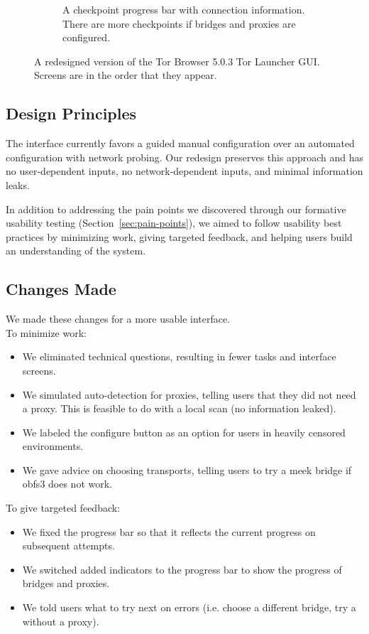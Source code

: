 \documentclass[USenglish,oneside,twocolumn]{article}
\begin{document}
\begin{figure}
\begin{subfigure}[b]{0.30\textwidth}
	\centering\captionsetup{width=1.5\linewidth}%
	\caption{A checkpoint progress bar with connection information. There are more checkpoints if bridges and proxies are configured.}
	\label{fig:new-progress}
\end{subfigure}
\caption{
A redesigned version of the Tor Browser 5.0.3 Tor Launcher GUI. Screens are in the order that they appear. 
}
\label{fig:new-interface}
\end{figure} 

\subsection{Design Principles} 
The interface currently favors a guided manual configuration over an automated configuration with network probing. Our redesign preserves this approach and has no user-dependent inputs, no network-dependent inputs, and minimal information leaks.

In addition to addressing the pain points we discovered through our formative usability testing (Section~\ref{sec:pain-points}), we aimed to follow usability best practices by minimizing work, giving targeted feedback, and helping users build an understanding of the system.

\subsection{Changes Made} 
We made these changes for a more usable interface. \\

\noindent To minimize work: 
\begin{itemize}
\item We eliminated technical questions, resulting in fewer tasks and interface screens. 
\item We simulated auto-detection for proxies, telling users that they did not need a proxy. This is feasible to do with a local scan (no information leaked). 
\item We labeled the configure button as an option for users in heavily censored environments.
\item We gave advice on choosing transports, telling users to try a meek bridge if obfs3 does not work.
\end{itemize} 

To give targeted feedback: 
\begin{itemize}
\item We fixed the progress bar so that it reflects the current progress on subsequent attempts. 
\item We switched added indicators to the progress bar to show the progress of bridges and proxies. 
\item We told users what to try next on errors (i.e. choose a different bridge, try a without a proxy). 
\end{itemize}
\end{document}
